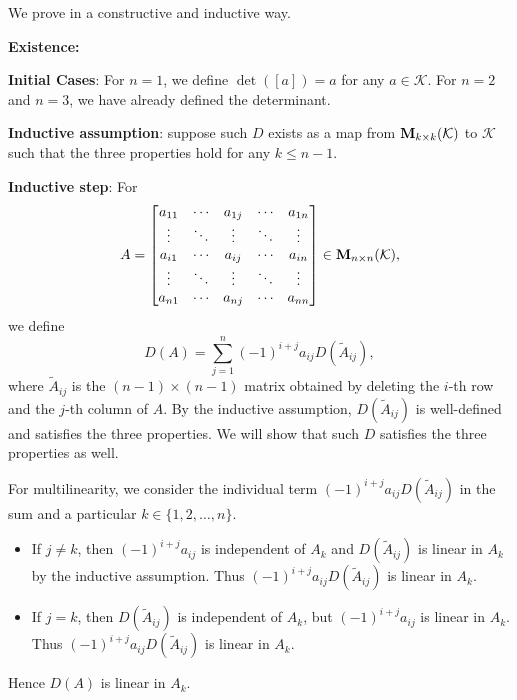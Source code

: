     \begin{proofenv}
        We prove in a constructive and inductive way.

        \noindent
        \textbf{Existence:} 
        
        \textbf{Initial Cases}: For $n=1$, we define $\det([a]) = a$ for any $a \in \mathcal{K}$. For $n=2$ and $n=3$, we have already defined the determinant.

        \textbf{Inductive assumption}: suppose such $D$ exists as a map from $\mathbf{M}_{k \times k}(\mathcal{K})$ to $\mathcal{K}$ such that the three properties hold for any $ k \le n-1$.

        \textbf{Inductive step}: For
        \[
        A = \begin{bmatrix}
            a_{11} & \cdots & a_{1j} & \cdots & a_{1n} \\
            \vdots & \ddots & \vdots & \ddots & \vdots \\
            a_{i1} & \cdots & a_{ij} & \cdots & a_{in} \\
            \vdots & \ddots & \vdots & \ddots & \vdots \\
            a_{n1} & \cdots & a_{nj} & \cdots & a_{nn}
        \end{bmatrix} \in \mathbf{M}_{n \times n}(\mathcal{K}),
        \]
        we define
        \[
        D(A) = \sum_{j=1}^n (-1)^{i+j} a_{ij} D(\tilde{A}_{ij}),
        \]
        where $\tilde{A}_{ij}$ is the $(n-1)\times (n-1)$ matrix obtained by deleting the $i$-th row and the $j$-th column of $A$. By the inductive assumption, $D(\tilde{A}_{ij})$ is well-defined and satisfies the three properties. We will show that such $D$ satisfies the three properties as well.

        For multilinearity, we consider the individual term $(-1)^{i+j} a_{ij} D(\tilde{A}_{ij})$ in the sum and a particular $k\in \{1,2,\ldots,n\}$.
        \begin{itemize}
            \item If $j\neq k$, then $(-1)^{i+j} a_{ij} $ is independent of $A_k$ and $D(\tilde{A}_{ij})$ is linear in $A_k$ by the inductive assumption. Thus $(-1)^{i+j} a_{ij} D(\tilde{A}_{ij})$ is linear in $A_k$.
            \item If $j=k$, then $D(\tilde{A}_{ij})$ is independent of $A_k$, but $(-1)^{i+j} a_{ij}$ is linear in $A_k$. Thus $(-1)^{i+j} a_{ij} D(\tilde{A}_{ij})$ is linear in $A_k$.
        \end{itemize}
        Hence $D(A)$ is linear in $A_k$.


\end{proofenv}
